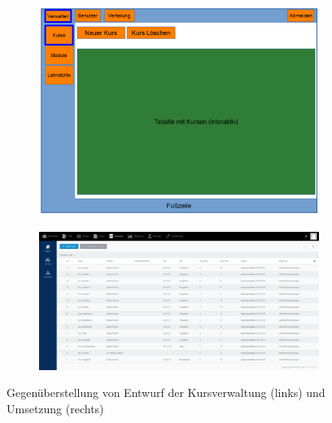         \begin{figure}
            \centering
            \begin{subfigure}{0.49\textwidth}
                \includegraphics[width=1.0\textwidth]{./implementation/images/MockUpsBackend/backendManageCourses.png}
            \end{subfigure}
            \begin{subfigure}{0.49\textwidth}
                \includegraphics[width=1.0\textwidth]{./implementation/images/manageCourses.png}
            \end{subfigure}
            \caption{Gegenüberstellung von Entwurf der Kursverwaltung (links) und Umsetzung (rechts)}
            \label{fig:comparisonManageCourses}
        \end{figure}
        
